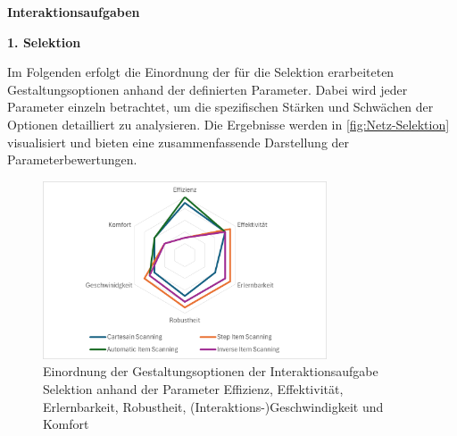 {\normalfont \bfseries Interaktionsaufgaben}  

\textbf{1. Selektion}

Im Folgenden erfolgt die Einordnung der für die Selektion erarbeiteten Gestaltungsoptionen anhand der definierten Parameter. Dabei wird jeder Parameter einzeln betrachtet, um die spezifischen Stärken und Schwächen der Optionen detailliert zu analysieren. Die Ergebnisse werden in \autoref{fig:Netz-Selektion} visualisiert und bieten eine zusammenfassende Darstellung der Parameterbewertungen.

\begin{figure}[tbh]
    \centering
    \includegraphics[width=0.75\textwidth]{images/Netzdiagramm-Selektion.png}
    \caption{Einordnung der Gestaltungsoptionen der Interaktionsaufgabe Selektion anhand der Parameter Effizienz, Effektivität, Erlernbarkeit, Robustheit, (Interaktions-)Geschwindigkeit und Komfort}
    \label{fig:Netz-Selektion}
\end{figure}

